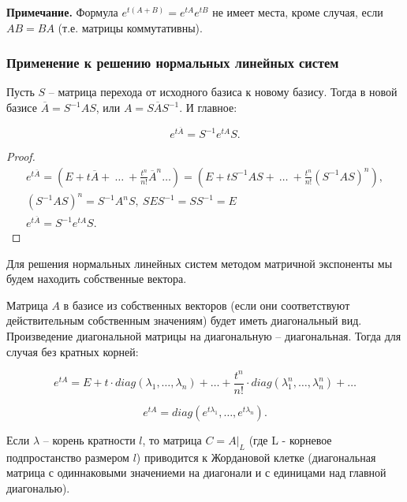 \textbf{Примечание.} Формула $e^{t(A+B)} = e^{tA}e^{tB}$ не имеет места, кроме случая, если $AB = BA$ (т.е. матрицы коммутативны).

\subsubsection{Применение к решению нормальных линейных систем}

\begin{theorem}

Пусть $S$ -- матрица перехода от исходного базиса к новому базису. Тогда в новой базисе $\overline{A} = S^{-1}AS$, или $A = S\overline{A}S^{-1}$. И главное:

\[e^{t\overline{A}} = S^{-1}e^{tA}S.\]

\end{theorem}

\begin{proof}
	\begin{equation*}
		\begin{gathered}
 e^{t\overline{A}} = \left(E + t\overline{A} +\ \dots\ + \frac{t^{n}}{n!}\overline{A}^{n} \dots \right) = \left(E + tS^{-1}AS +\ \dots\ + \frac{t^{n}}{n!}(S^{-1}AS)^{n}\right), \\
 (S^{-1}AS)^n = S^{-1}A^nS,\ SES^{-1} = SS^{-1} = E \\
 e^{t\overline{A}} = S^{-1}e^{tA}S.
		\end{gathered}
	\end{equation*}
\end{proof}

Для решения нормальных линейных систем методом матричной экспоненты мы будем находить собственные вектора.

Матрица $A$ в базисе из собственных векторов (если они соответствуют действительным собственным значениям) будет иметь диагональный вид. Произведение диагональной матрицы на диагональную -- диагональная. Тогда для случая без кратных корней:

\[ e^{tA} = E + t\cdot diag(\lambda_1, \dots, \lambda_n) + \dots + \frac{t^n}{n!}\cdot diag(\lambda_1^n, \dots , \lambda_n^n) + \dots\]

\[ e^{tA} = diag(e^{t\lambda_1}, \dots, e^{t\lambda_n}).\]

Если $\lambda$ -- корень кратности $l$, то матрица $C = A|_{L}$ (где L - корневое подпростанство размером $l$)  приводится к Жордановой клетке (диагональная матрица с одиннаковыми значениеми на диагонали и с единицами над главной диагональю).

